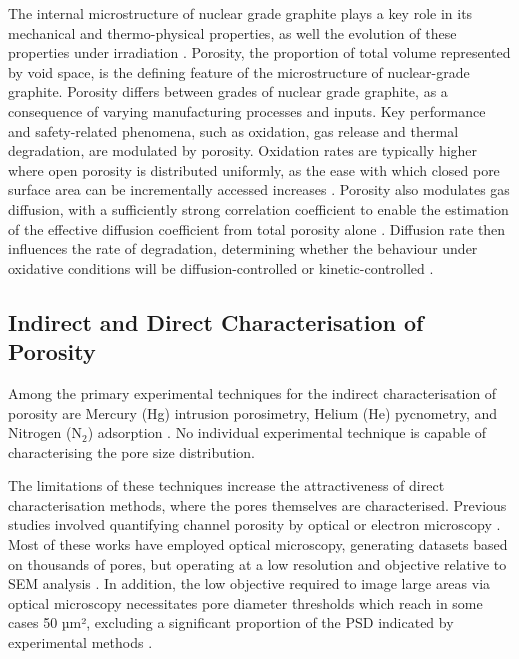 \documentclass[review]{elsarticle}
\begin{document}
The internal microstructure of nuclear grade graphite plays a key role in its
mechanical and thermo-physical properties, as well the evolution of these
properties under irradiation \citep{MARSDENgeniv}. Porosity, the proportion of
total volume represented by void space,  is the defining feature of the
microstructure of nuclear-grade graphite.  Porosity differs between grades of
nuclear grade graphite, as a consequence of varying manufacturing processes and
inputs\citep{ARREGUIMENA2022112047}. Key performance and safety-related
phenomena, such as oxidation, gas release and thermal degradation, are modulated
by porosity. Oxidation rates are typically higher where open porosity is
distributed uniformly, as the ease with which closed pore surface area can be
incrementally accessed increases \citep{PAUL2022132}. Porosity also modulates
gas diffusion, with a sufficiently strong correlation coefficient to enable the
estimation of the effective diffusion coefficient from total porosity alone
\citep{KANE2018369}. Diffusion rate then influences the rate of degradation,
determining whether the behaviour under oxidative conditions will be
diffusion-controlled or kinetic-controlled \citep{MATTHEWS2021111245}. 

\subsection{Indirect and Direct Characterisation of Porosity}

Among the primary experimental techniques for the indirect characterisation of
porosity are Mercury (Hg) intrusion porosimetry, Helium (He) pycnometry, and
Nitrogen (N$_2$) adsorption \citep{ARREGUIMENA2022112047, JONES2020256HgHe,
CONTESCU2019663}. No individual experimental technique is capable of
characterising the pore size distribution. 

The limitations  of these techniques increase the attractiveness of direct
characterisation methods, where the pores themselves are characterised. Previous
studies involved quantifying channel porosity  by optical or electron microscopy
\citep{Huang2014, Huang2019, Kane2011a, Kim2010,
Taylor2016,huang2021statistical, ARREGUIMENA2022112047}. Most of these works
have employed optical microscopy, generating datasets based on thousands of
pores, but operating at a low resolution and objective relative to SEM analysis
\citep{Huang2019, Kane2011a, Taylor2016}. In addition, the low objective
required to image large areas via optical microscopy necessitates pore diameter
thresholds which reach in some cases 50 µm², excluding a significant proportion
of the PSD indicated by experimental methods \citep{Huang2019, Kane2011a,
Taylor2016}. 
\end{document}
